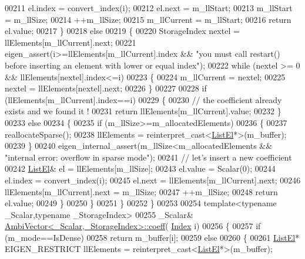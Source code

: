 \begin{DoxyCode}
00211       el.index = convert\_index(i);
00212       el.next = m\_llStart;
00213       m\_llStart = m\_llSize;
00214       ++m\_llSize;
00215       m\_llCurrent = m\_llStart;
00216       \textcolor{keywordflow}{return} el.value;
00217     \}
00218     \textcolor{keywordflow}{else}
00219     \{
00220       StorageIndex nextel = llElements[m\_llCurrent].next;
00221       eigen\_assert(i>=llElements[m\_llCurrent].index && \textcolor{stringliteral}{"you must call restart() before inserting an element
       with lower or equal index"});
00222       \textcolor{keywordflow}{while} (nextel >= 0 && llElements[nextel].index<=i)
00223       \{
00224         m\_llCurrent = nextel;
00225         nextel = llElements[nextel].next;
00226       \}
00227 
00228       \textcolor{keywordflow}{if} (llElements[m\_llCurrent].index==i)
00229       \{
00230         \textcolor{comment}{// the coefficient already exists and we found it !}
00231         \textcolor{keywordflow}{return} llElements[m\_llCurrent].value;
00232       \}
00233       \textcolor{keywordflow}{else}
00234       \{
00235         \textcolor{keywordflow}{if} (m\_llSize>=m\_allocatedElements)
00236         \{
00237           reallocateSparse();
00238           llElements = \textcolor{keyword}{reinterpret\_cast<}\hyperlink{struct_eigen_1_1internal_1_1_ambi_vector_1_1_list_el}{ListEl}*\textcolor{keyword}{>}(m\_buffer);
00239         \}
00240         eigen\_internal\_assert(m\_llSize<m\_allocatedElements && \textcolor{stringliteral}{"internal error: overflow in sparse mode"});
00241         \textcolor{comment}{// let's insert a new coefficient}
00242         \hyperlink{struct_eigen_1_1internal_1_1_ambi_vector_1_1_list_el}{ListEl}& el = llElements[m\_llSize];
00243         el.value = Scalar(0);
00244         el.index = convert\_index(i);
00245         el.next = llElements[m\_llCurrent].next;
00246         llElements[m\_llCurrent].next = m\_llSize;
00247         ++m\_llSize;
00248         \textcolor{keywordflow}{return} el.value;
00249       \}
00250     \}
00251   \}
00252 \}
00253 
00254 \textcolor{keyword}{template}<\textcolor{keyword}{typename} \_Scalar,\textcolor{keyword}{typename} \_StorageIndex>
00255 \_Scalar& \hyperlink{class_eigen_1_1internal_1_1_ambi_vector}{AmbiVector<\_Scalar,\_StorageIndex>::coeff}(
      \hyperlink{namespace_eigen_a62e77e0933482dafde8fe197d9a2cfde}{Index} i)
00256 \{
00257   \textcolor{keywordflow}{if} (m\_mode==IsDense)
00258     \textcolor{keywordflow}{return} m\_buffer[i];
00259   \textcolor{keywordflow}{else}
00260   \{
00261     \hyperlink{struct_eigen_1_1internal_1_1_ambi_vector_1_1_list_el}{ListEl}* EIGEN\_RESTRICT llElements = \textcolor{keyword}{reinterpret\_cast<}\hyperlink{struct_eigen_1_1internal_1_1_ambi_vector_1_1_list_el}{ListEl}*\textcolor{keyword}{>}(m\_buffer);

\end{DoxyCode}
